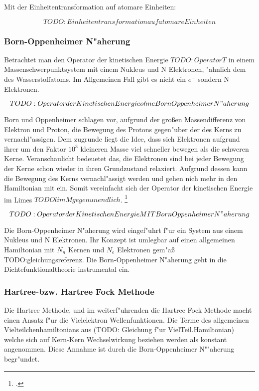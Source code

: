 Mit der Einheitentransformation auf atomare Einheiten: 

$$TODO: Einheitentransformation auf atomare Einheiten$$

\subsubsection{Born-Oppenheimer N"aherung}
Betrachtet man den Operator der kinetischen Energie $TODO: Operator T$ in einem Massenschwerpunktsystem mit einem Nukleus und N Elektronen, "ahnlich dem des Wasserstoffatoms. Im Allgemeinen Fall gibt es nicht ein $e^-$ sondern N Elektronen. 

$$TODO: Operator der Kinetischen Energie ohne Born Oppenheimer N"aherung$$

Born und Oppenheimer schlagen vor, aufgrund der großen Massendifferenz von Elektron und Proton, die Bewegung des Protons gegen"uber der des Kerns zu vernachl"assigen. Dem zugrunde liegt die Idee, dass sich Elektronen aufgrund ihrer um den Faktor $10^3$ kleineren Masse viel schneller bewegen als die schweren Kerne. Veranschaulicht bedeuetet das, die Elektronen sind bei jeder Bewegung der Kerne schon wieder in ihren Grundzustand relaxiert. Aufgrund dessen kann die Bewegung des Kerns vernachl"assigt werden und gehen nich mehr in den Hamiltonian mit ein. Somit vereinfacht sich der Operator der kinetischen Energie im Limes $TODO lim M gegen unendlich$. 
\footcite[272]{hjorth-jensen}

$$TODO: Operator der Kinetischen Energie MIT Born Oppenheimer N"aherung$$


Die Born-Oppenheimer N"aherung wird eingef"uhrt f"ur ein System aus einem Nukleus und N Elektronen. Ihr Konzept ist umlegbar auf einen allgemeinen Hamiltonian mit  $N_n$  Kernen und $N_e$  Elektronen gem"aß TODO:gleichungsreferenz. Die Born-Oppenheimer N"aherung geht in die Dichtefunktionaltheorie instrumental ein. 


\subsubsection{Hartree-bzw. Hartree Fock Methode}
Die Hartree Methode, und im weiterf"uhrenden die Hartree Fock Methode macht einen Ansatz f"ur die Vielelektron Wellenfunktionen. Die Terme des allgemeinen Vielteilchenhamiltonians aus (TODO: Gleichung f"ur  VielTeil.Hamiltonian) welche sich auf Kern-Kern Wechselwirkung beziehen werden als konstant angenommen. Diese Annahme ist durch die Born-Oppenheimer N""aherung begr"undet.


